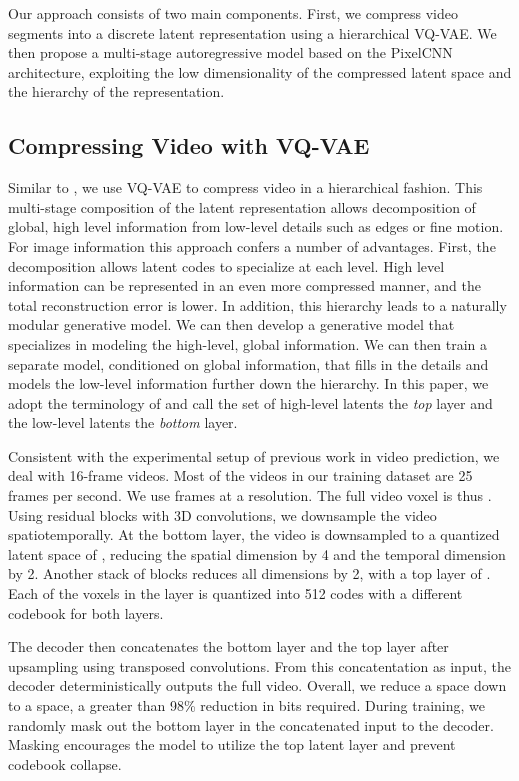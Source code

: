 \documentclass{article}
\begin{document}
Our approach consists of two main components. First, we compress video segments into a discrete latent representation using a hierarchical VQ-VAE. We then propose a multi-stage autoregressive model based on the PixelCNN architecture, exploiting the low dimensionality of the compressed latent space and the hierarchy of the representation. 

\subsection{Compressing Video with VQ-VAE}
Similar to \cite{RazaviOV19}, we use VQ-VAE to compress video in a hierarchical fashion. This multi-stage composition of the latent representation allows decomposition of global, high level information from low-level details such as edges or fine motion. For image information \cite{RazaviOV19} this approach confers a number of advantages. First, the decomposition allows latent codes to specialize at each level. High level information can be represented in an even more compressed manner, and the total reconstruction error is lower. In addition, this hierarchy leads to a naturally modular generative model. We can then develop a generative model that specializes in modeling the high-level, global information. We can then train a separate model, conditioned on global information, that fills in the details and models the low-level information further down the hierarchy. In this paper, we adopt the terminology of \cite{RazaviOV19} and call the set of high-level latents the \emph{top} layer and the low-level latents the \emph{bottom} layer. 

Consistent with the experimental setup of previous work in video prediction, we deal with 16-frame videos. Most of the videos in our training dataset are 25 frames per second. We use frames at a  resolution. The full video voxel is thus . Using residual blocks with 3D convolutions, we downsample the video spatiotemporally. At the bottom layer, the video is downsampled to a quantized latent space of , reducing the spatial dimension by 4 and the temporal dimension by 2. Another stack of blocks reduces all dimensions by 2, with a top layer of . Each of the voxels in the layer is quantized into 512 codes with a different codebook for both layers.

The decoder then concatenates the bottom layer and the top layer after upsampling using transposed convolutions. From this concatentation as input, the decoder deterministically outputs the full  video. Overall, we reduce a  space down to a  space, a greater than 98\% reduction in bits required.  During training, we randomly mask out the bottom layer in the concatenated input to the decoder. Masking encourages the model to utilize the top latent layer and prevent codebook collapse.
\end{document}
